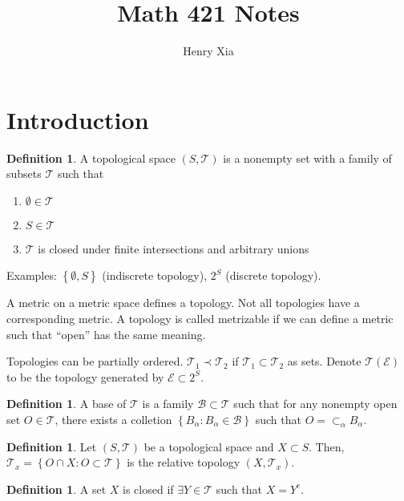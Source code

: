 \documentclass[11pt]{article}
\title{Math 421 Notes}
\author{Henry Xia}
\theoremstyle{definition}
\newtheorem{defn}[thm]{Definition}
\newcommand{\set}[1]{\left\{ #1 \right\}}
\newcommand{\m}[1]{\mathcal{#1}}
\begin{document}
\maketitle

\tableofcontents


\section{Introduction}

\begin{defn} A topological space $(S,\m{T})$ is a nonempty set with a family of subsets
$\m{T}$ such that
\begin{enumerate}
  \item $\emptyset\in\m{T}$
  \item $S\in\m{T}$
  \item $\m{T}$ is closed under finite intersections and arbitrary unions
\end{enumerate}
\end{defn}

Examples: $\set{\emptyset,S}$ (indiscrete topology), $2^S$ (discrete topology).

A metric on a metric space defines a topology. Not all topologies have a corresponding
metric. A topology is called metrizable if we can define a metric such that ``open'' has
the same meaning.

Topologies can be partially ordered. $\m{T}_1\prec\m{T}_2$ if $\m{T}_1\subset\m{T}_2$ as
sets. Denote $\m{T}(\m{E})$ to be the topology generated by $\m{E}\subset 2^S$.

\begin{defn}
A base of $\m{T}$ is a family $\m{B}\subset\m{T}$ such that for any nonempty open set
$O\in\m{T}$, there exists a colletion $\set{B_\alpha:B_\alpha\in\m{B}}$ such that
$O=\subset_\alpha B_\alpha$.
\end{defn}

\begin{defn}
Let $(S,\m{T})$ be a topological space and $X\subset S$. Then, $\m{T}_x=\set{O\cap X:
O\subset\m{T}}$ is the relative topology $(X,\m{T}_x)$.
\end{defn}

\begin{defn}
A set $X$ is closed if $\exists Y\in\m{T}$ such that $X=Y^c$.
\end{defn}
\end{document}
